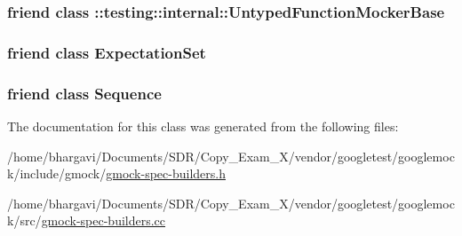 \subsubsection[{\texorpdfstring{\+::testing\+::internal\+::\+Untyped\+Function\+Mocker\+Base}{::testing::internal::UntypedFunctionMockerBase}}]{\setlength{\rightskip}{0pt plus 5cm}friend class \+::{\bf testing\+::internal\+::\+Untyped\+Function\+Mocker\+Base}\hspace{0.3cm}{\ttfamily [friend]}}\hypertarget{classtesting_1_1_expectation_a709c2d6bee1223cfbcadc58e884cdb4b}{}\label{classtesting_1_1_expectation_a709c2d6bee1223cfbcadc58e884cdb4b}
\subsubsection[{\texorpdfstring{Expectation\+Set}{ExpectationSet}}]{\setlength{\rightskip}{0pt plus 5cm}friend class {\bf Expectation\+Set}\hspace{0.3cm}{\ttfamily [friend]}}\hypertarget{classtesting_1_1_expectation_acf5c2877a449d4ad1889ee5833ebb193}{}\label{classtesting_1_1_expectation_acf5c2877a449d4ad1889ee5833ebb193}
\subsubsection[{\texorpdfstring{Sequence}{Sequence}}]{\setlength{\rightskip}{0pt plus 5cm}friend class {\bf Sequence}\hspace{0.3cm}{\ttfamily [friend]}}\hypertarget{classtesting_1_1_expectation_a26271d5afaff6e6d3f00c055c63d0b24}{}\label{classtesting_1_1_expectation_a26271d5afaff6e6d3f00c055c63d0b24}


The documentation for this class was generated from the following files\+:\begin{DoxyCompactItemize}
\item 
/home/bhargavi/\+Documents/\+S\+D\+R/\+Copy\+\_\+\+Exam\+\_\+X/vendor/googletest/googlemock/include/gmock/\hyperlink{gmock-spec-builders_8h}{gmock-\/spec-\/builders.\+h}\item 
/home/bhargavi/\+Documents/\+S\+D\+R/\+Copy\+\_\+\+Exam\+\_\+X/vendor/googletest/googlemock/src/\hyperlink{gmock-spec-builders_8cc}{gmock-\/spec-\/builders.\+cc}\end{DoxyCompactItemize}
